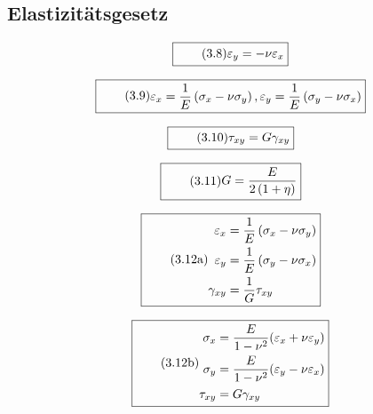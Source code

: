 \documentclass[11pt]{article}
\newcommand{\1}{ {\mathds{1}} }
\renewcommand{\epsilon}{\varepsilon}
\begin{document}
		\subsection{Elastizitätsgesetz}

		\begin{equation}
			\boxed{
				\tag{3.8}
				\begin{split}
			\varepsilon_y = -\nu \varepsilon_x
				\end{split}
			}
		\end{equation}

		\begin{equation}
			\boxed{
				\tag{3.9}
				\begin{split}
			\varepsilon_x = \frac{1}{E} \left( \sigma_x - \nu\sigma_y \right), 
			\varepsilon_y = \frac{1}{E} \left( \sigma_y - \nu\sigma_x \right)
				\end{split}
			}
		\end{equation}

		\begin{equation}
			\boxed{
				\tag{3.10}
				\begin{split}
			\tau_{xy} = G \gamma_{xy}
				\end{split}
			}
		\end{equation}

		\begin{equation}
			\boxed{
				\tag{3.11}
				\begin{split}
					G = \frac{E}{2\left(1+\eta\right)}
				\end{split}
			}
		\end{equation}

		\begin{equation}
			\boxed{
				\tag{3.12a}
				\begin{split}
					\varepsilon_x &= \frac{1}{E}\left(\sigma_x - \nu \sigma_y\right)
					\\
					\varepsilon_y &= \frac{1}{E}\left(\sigma_y - \nu \sigma_x\right)
					\\
			\gamma_{xy} &= \frac{1}{G}\tau_{xy}
				\end{split}
			}
		\end{equation}

		\begin{equation}
			\boxed{
				\tag{3.12b}
				\begin{split}
					\sigma_x &= \frac{E}{1 - \nu^2}(\epsilon_x + \nu \epsilon_y) \\
					\sigma_y &= \frac{E}{1 -\nu^2}(\epsilon_y - \nu \epsilon_x) \\
					\tau_{xy} &= G \gamma_{xy}
				\end{split}
			}
		\end{equation}
\end{document}
